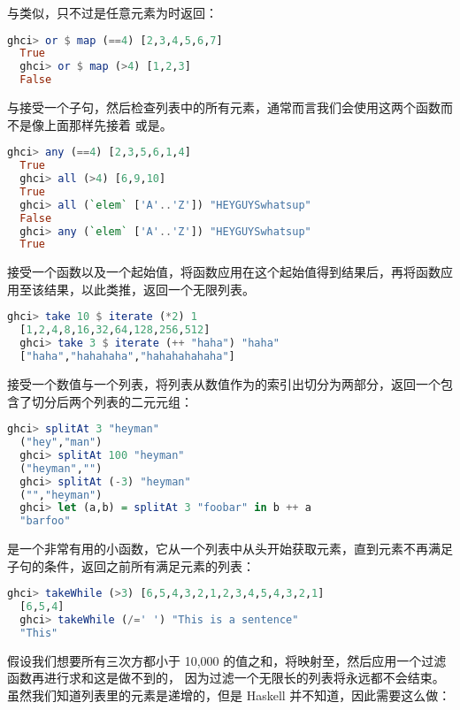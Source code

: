 \documentclass[./main.tex]{subfiles}
\begin{document}
与类似，只不过是任意元素为时返回：

\begin{lstlisting}[language=Haskell]
  ghci> or $ map (==4) [2,3,4,5,6,7]
  True
  ghci> or $ map (>4) [1,2,3]
  False
\end{lstlisting}

与接受一个子句，然后检查列表中的所有元素，通常而言我们会使用这两个函数而不是像上面那样先接着
或是。

\begin{lstlisting}[language=Haskell]
  ghci> any (==4) [2,3,5,6,1,4]
  True
  ghci> all (>4) [6,9,10]
  True
  ghci> all (`elem` ['A'..'Z']) "HEYGUYSwhatsup"
  False
  ghci> any (`elem` ['A'..'Z']) "HEYGUYSwhatsup"
  True
\end{lstlisting}

接受一个函数以及一个起始值，将函数应用在这个起始值得到结果后，再将函数应用至该结果，以此类推，返回一个无限列表。

\begin{lstlisting}[language=Haskell]
  ghci> take 10 $ iterate (*2) 1
  [1,2,4,8,16,32,64,128,256,512]
  ghci> take 3 $ iterate (++ "haha") "haha"
  ["haha","hahahaha","hahahahahaha"]
\end{lstlisting}

接受一个数值与一个列表，将列表从数值作为的索引出切分为两部分，返回一个包含了切分后两个列表的二元元组：

\begin{lstlisting}[language=Haskell]
  ghci> splitAt 3 "heyman"
  ("hey","man")
  ghci> splitAt 100 "heyman"
  ("heyman","")
  ghci> splitAt (-3) "heyman"
  ("","heyman")
  ghci> let (a,b) = splitAt 3 "foobar" in b ++ a
  "barfoo"
\end{lstlisting}

是一个非常有用的小函数，它从一个列表中从头开始获取元素，直到元素不再满足子句的条件，返回之前所有满足元素的列表：

\begin{lstlisting}[language=Haskell]
  ghci> takeWhile (>3) [6,5,4,3,2,1,2,3,4,5,4,3,2,1]
  [6,5,4]
  ghci> takeWhile (/=' ') "This is a sentence"
  "This"
\end{lstlisting}

假设我们想要所有三次方都小于 10,000 的值之和，将映射至\acode{[1..]}，然后应用一个过滤函数再进行求和这是做不到的，
因为过滤一个无限长的列表将永远都不会结束。虽然我们知道列表里的元素是递增的，但是 Haskell 并不知道，因此需要这么做：
\end{document}
